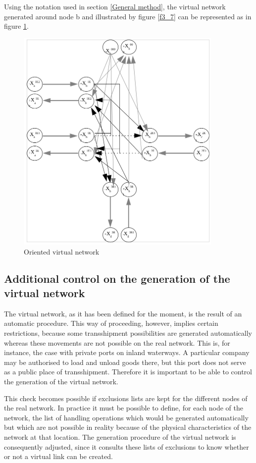 Using the notation used in section \ref{General method}, the virtual network generated around node b and illustrated by figure \ref{f3_7} can be represented as in figure \ref{f3_7b}.

\begin{figure}[htbp]
\centerline{\includegraphics[width=10cm]{f3_7b.png}}
\caption{\label{f3_7b} Oriented virtual network}
\end{figure}


\subsection{Additional control on the generation of the virtual network}


The virtual network, as it has been defined for the moment, is the result of an
automatic procedure.  This way of proceeding, however, implies certain
restrictions, because some transshipment possibilities are generated
automatically whereas these movements are not possible on the real network.
This is, for instance, the case with private ports on inland waterways.  A
particular company may be authorised to load and unload goods there, but this
port does not serve as a public place of transshipment.  Therefore it is
important to be able to control the generation of the virtual network.

This check becomes possible if exclusions lists are kept for the different
nodes of the real network.  In practice it must be possible to define, for each
node of the network, the list of handling operations which would be generated
automatically but which are not possible in reality because of the physical
characteristics of the network at that location.  The generation procedure of
the virtual network is consequently adjusted, since it consults these lists of
exclusions to know whether or not a virtual link can be created.

